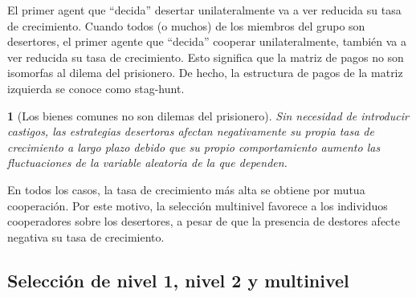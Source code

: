 \documentclass[a4paper,10pt]{article}
\newif\ifen
\newif\ifes
\newcommand{\en}[1]{\ifen#1\fi}
\newcommand{\es}[1]{\ifes#1\fi}
\newtheorem{conclution}{\en{Conclution}\es{Conclusión}}%
\begin{document}
%
El primer agent que ``decida'' desertar unilateralmente va a ver reducida su tasa de crecimiento.
%
Cuando todos (o muchos) de los miembros del grupo son desertores, el primer agente que ``decida'' cooperar unilateralmente, también va a ver reducida su tasa de crecimiento.
%
Esto significa que la matriz de pagos no son isomorfas al dilema del prisionero.
%
De hecho, la estructura de pagos de la matriz izquierda se conoce como stag-hunt.
%
\begin{conclution}[Los bienes comunes no son dilemas del prisionero]
Sin necesidad de introducir castigos, las estrategias desertoras afectan negativamente su propia tasa de crecimiento a largo plazo debido que su propio comportamiento aumento las fluctuaciones de la variable aleatoria de la que dependen.
\end{conclution}
%
En todos los casos, la tasa de crecimiento más alta se obtiene por mutua cooperación.
%
Por este motivo, la selección multinivel favorece a los individuos cooperadores sobre los desertores, a pesar de que la presencia de destores afecte negativa su tasa de crecimiento.


\subsection{Selección de nivel 1, nivel 2 y multinivel}
\end{document}
